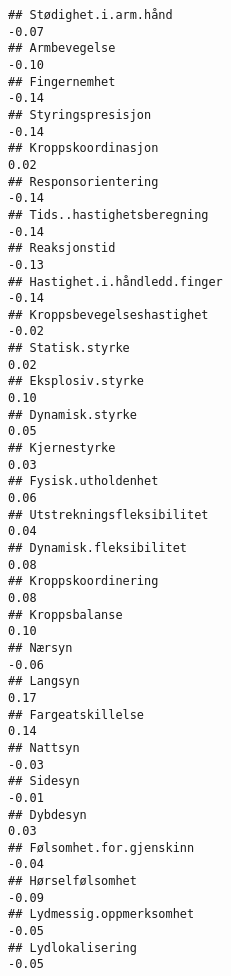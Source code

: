 \documentclass[
]{article}
\begin{document}
\begin{verbatim}
## Stødighet.i.arm.hånd                                                             -0.07
## Armbevegelse                                                                     -0.10
## Fingernemhet                                                                     -0.14
## Styringspresisjon                                                                -0.14
## Kroppskoordinasjon                                                                0.02
## Responsorientering                                                               -0.14
## Tids..hastighetsberegning                                                        -0.14
## Reaksjonstid                                                                     -0.13
## Hastighet.i.håndledd.finger                                                      -0.14
## Kroppsbevegelseshastighet                                                        -0.02
## Statisk.styrke                                                                    0.02
## Eksplosiv.styrke                                                                  0.10
## Dynamisk.styrke                                                                   0.05
## Kjernestyrke                                                                      0.03
## Fysisk.utholdenhet                                                                0.06
## Utstrekningsfleksibilitet                                                         0.04
## Dynamisk.fleksibilitet                                                            0.08
## Kroppskoordinering                                                                0.08
## Kroppsbalanse                                                                     0.10
## Nærsyn                                                                           -0.06
## Langsyn                                                                           0.17
## Fargeatskillelse                                                                  0.14
## Nattsyn                                                                          -0.03
## Sidesyn                                                                          -0.01
## Dybdesyn                                                                          0.03
## Følsomhet.for.gjenskinn                                                          -0.04
## Hørselfølsomhet                                                                  -0.09
## Lydmessig.oppmerksomhet                                                          -0.05
## Lydlokalisering                                                                  -0.05

\end{verbatim}
\end{document}
